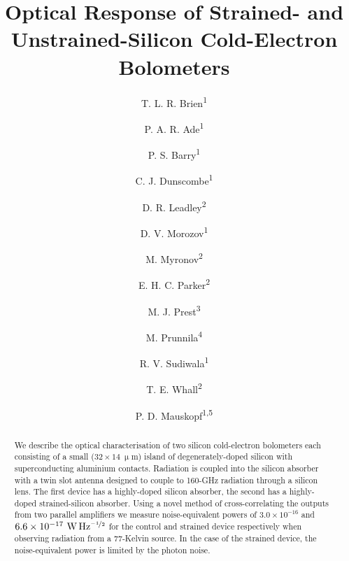 \documentclass[final]{svjour2}
\begin{document}
\newcommand{\hdblarrow}{H\makebox[0.9ex][l]{$\downdownarrows$}-}
\title{Optical Response of Strained- and Unstrained-Silicon Cold-Electron Bolometers}
\author{T. L. R. Brien\textsuperscript{1} \and 
P. A. R. Ade\textsuperscript{1} \and 
P. S. Barry\textsuperscript{1} \and C. J. Dunscombe\textsuperscript{1} \and 
D. R. Leadley\textsuperscript{2} \and D. V. Morozov\textsuperscript{1} \and 
M. Myronov\textsuperscript{2} \and E. H. C. Parker\textsuperscript{2} \and 
M. J. Prest\textsuperscript{3} \and M. Prunnila\textsuperscript{4} \and 
R. V. Sudiwala\textsuperscript{1} \and T. E. Whall\textsuperscript{2} \and 
P. D. Mauskopf\textsuperscript{1,5}}
%
%
\maketitle

\begin{abstract}
We describe the optical characterisation of two silicon cold-electron bolometers each consisting of a small ($32 \times 14~\mathrm{\upmu m}$) island of degenerately-doped silicon with superconducting aluminium contacts. Radiation is coupled into the silicon absorber with a twin slot antenna designed to couple to 160-GHz radiation through a silicon lens. The first device has a highly-doped silicon absorber, the second has a highly-doped strained-silicon absorber. Using a novel method of cross-correlating the outputs from two parallel amplifiers we measure noise-equivalent powers of $3.0 \times 10^{-16}$  and $6.6 \times 10^{-17}~\mathrm{W\,Hz^{\nicefrac{-1}{2}}}$ for the control and strained device respectively when observing radiation from a 77-Kelvin source. In the case of the strained device, the noise-equivalent power is limited by the photon noise.  %
\end{abstract}
%
\end{document}
